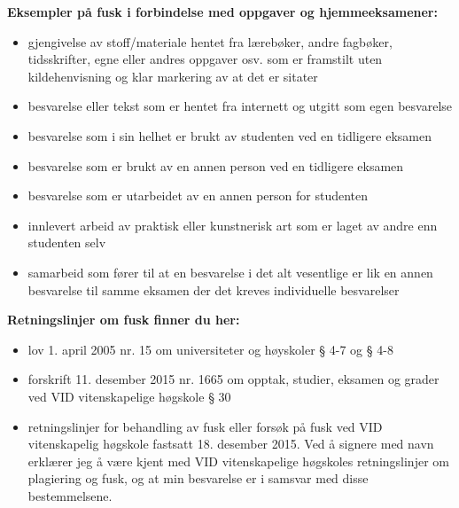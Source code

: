 \begin{scriptsize}

\noindent
\textbf{Eksempler på fusk i forbindelse med oppgaver og hjemmeeksamener:}
\begin{itemize}[leftmargin=0.5cm]
\item gjengivelse av stoff/materiale hentet fra lærebøker, andre fagbøker, tidsskrifter, egne eller andres oppgaver osv. som er framstilt uten kildehenvisning og klar markering av at det er sitater 
\item besvarelse eller tekst som er hentet fra internett og utgitt som egen besvarelse 
\item besvarelse som i sin helhet er brukt av studenten ved en tidligere eksamen 
\item besvarelse som er brukt av en annen person ved en tidligere eksamen 
\item besvarelse som er utarbeidet av en annen person for studenten 
\item innlevert arbeid av praktisk eller kunstnerisk art som er laget av andre enn studenten selv 
\item samarbeid som fører til at en besvarelse i det alt vesentlige er lik en annen besvarelse til samme eksamen der det kreves individuelle besvarelser
\end{itemize}

\noindent
\textbf{Retningslinjer om fusk finner du her:}
\begin{itemize}[leftmargin=0.5cm]
\item lov 1. april 2005 nr. 15 om universiteter og høyskoler § 4-7 og § 4-8 
\item forskrift 11. desember 2015 nr. 1665 om opptak, studier, eksamen og grader ved VID vitenskapelige høgskole § 30
\item retningslinjer for behandling av fusk eller forsøk på fusk ved VID vitenskapelig høgskole fastsatt 18. desember 2015.
Ved å signere med navn erklærer jeg å være kjent med VID vitenskapelige høgskoles retningslinjer om plagiering og fusk, og at min besvarelse er i samsvar med disse bestemmelsene.
\end{itemize}
\end{scriptsize}

\begin{center}
	\vspace*{\fill}
	\vspace*{\fill}
\end{center}

